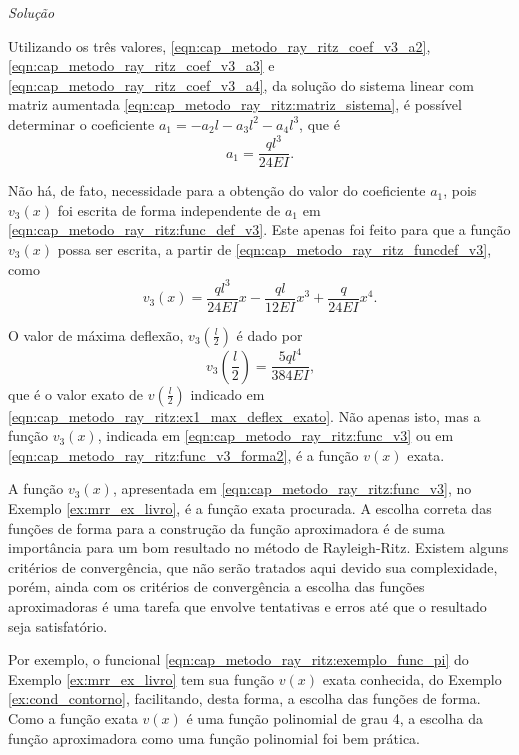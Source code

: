 \documentclass[
	12pt,				%
	openright,			%
    twoside,			%
	a4paper,			%
	chapter=TITLE,		%
	english,			%
	french,				%
	spanish,			%
	brazil				%
	]{abntex2}
\makeatletter
\renewenvironment{proof}[1][\proofname]{
	\par\pushQED{\qed}%
	\normalfont \topsep6\p@\@plus6\p@\relax
	\trivlist
	\item\relax
		{\itshape
			#1\@addpunct{.}}\hspace\labelsep\ignorespaces
}{%
	\popQED\endtrivlist\@endpefalse
}
\newenvironment{solution}{
	\begin{proof}[Solução]
}{%
	\end{proof}
}
\numberwithin{lema}{chapter}
\numberwithin{teorema}{chapter}
\numberwithin{definicao}{chapter}
\numberwithin{exemplo}{chapter}
\numberwithin{figure}{chapter}
\makeatother
\begin{document}
\begin{solution}
	Utilizando os três valores, \eqref{eqn:cap_metodo_ray_ritz_coef_v3_a2}, \eqref{eqn:cap_metodo_ray_ritz_coef_v3_a3} e \eqref{eqn:cap_metodo_ray_ritz_coef_v3_a4}, da solução do sistema linear com matriz aumentada \eqref{eqn:cap_metodo_ray_ritz:matriz_sistema}, é possível determinar o coeficiente $a_1=-a_2l-a_3l^2-a_4l^3$, que é
	\begin{equation}
		\label{eqn:cap_metodo_ray_ritz_coef_v3_a1}
		a_1 = \frac{ql^3}{24EI}
		\text{.}
	\end{equation}	
	
	Não há, de fato, necessidade para a obtenção do valor do coeficiente $a_1$, pois $v_3(x)$ foi escrita de forma independente de $a_1$ em \eqref{eqn:cap_metodo_ray_ritz:func_def_v3}. Este apenas foi feito para que a função $v_3(x)$ possa ser escrita, a partir de \eqref{eqn:cap_metodo_ray_ritz_funcdef_v3}, como
	\begin{equation}
		\label{eqn:cap_metodo_ray_ritz:func_v3_forma2}
		v_3(x)=
			\frac{ql^3}{24EI} x
			-
			\frac{ql}{12EI} x^3
			+
			\frac{q}{24EI} x^4
		\text{.}
	\end{equation}


	O valor de máxima deflexão, $v_3(\frac{l}{2})$ é dado por
	$$
		v_3(\frac{l}{2})=\frac{5ql^4}{384EI}
		\text{,}
	$$
	que é o valor exato de $v(\frac{l}{2})$ indicado em \eqref{eqn:cap_metodo_ray_ritz:ex1_max_deflex_exato}. Não apenas isto, mas a função $v_3(x)$, indicada em \eqref{eqn:cap_metodo_ray_ritz:func_v3} ou em \eqref{eqn:cap_metodo_ray_ritz:func_v3_forma2}, é a função $v(x)$ exata.
	
\end{solution}

A função $v_3(x)$, apresentada em \eqref{eqn:cap_metodo_ray_ritz:func_v3}, no Exemplo \ref{ex:mrr_ex_livro}, é a função exata procurada. A escolha correta das funções de forma para a construção da função aproximadora é de suma importância para um bom resultado no método de Rayleigh-Ritz. Existem alguns critérios de convergência, que não serão tratados aqui devido sua complexidade, porém, ainda com os critérios de convergência a escolha das funções aproximadoras é uma tarefa que envolve tentativas e erros até que o resultado seja satisfatório. 

Por exemplo, o funcional \eqref{eqn:cap_metodo_ray_ritz:exemplo_func_pi} do Exemplo \ref{ex:mrr_ex_livro} tem sua função $v(x)$ exata conhecida, do Exemplo \ref{ex:cond_contorno}, facilitando, desta forma, a escolha das funções de forma. Como a função exata $v(x)$ é uma função polinomial de grau 4, a escolha da função aproximadora como uma função polinomial foi bem prática.
\end{document}
